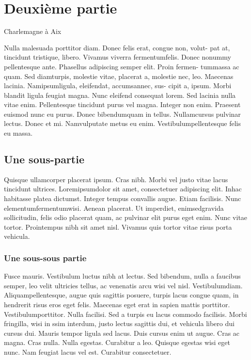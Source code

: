 \documentclass[12pt,twoside]{book}
\begin{document}
\section{Deuxième partie}

Charlemagne à Aix


Nulla malesuada porttitor diam. Donec felis erat, congue non, volut-
pat at, tincidunt tristique, libero. Vivamus viverra fermentumfelis. Donec
nonummy pellentesque ante. Phasellus adipiscing semper elit. Proin fermen-
tummassa ac quam. Sed diamturpis, molestie vitae, placerat a, molestie
nec, leo. Maecenas lacinia. Namipsumligula, eleifendat, accumsannec, sus-
cipit a, ipsum. Morbi blandit ligula feugiat magna. Nunc eleifend consequat
lorem. Sed lacinia nulla vitae enim. Pellentesque tincidunt purus vel magna.
Integer non enim. Praesent euismod nunc eu purus. Donec bibendumquam
in tellus. Nullamcursus pulvinar lectus. Donec et mi. Namvulputate metus
eu enim. Vestibulumpellentesque felis eu massa.

\subsection{Une sous-partie}
Quisque ullamcorper placerat ipsum. Cras nibh. Morbi vel justo vitae
lacus tincidunt ultrices. Loremipsumdolor sit amet, consectetuer adipiscing
elit. Inhac habitasse platea dictumst. Integer tempus convallis augue. Etiam
facilisis. Nunc elementumfermentumwisi. Aenean placerat. Ut imperdiet,
enimsedgravida sollicitudin, felis odio placerat quam, ac pulvinar elit purus
eget enim. Nunc vitae tortor. Prointempus nibh sit amet nisl. Vivamus quis
tortor vitae risus porta vehicula.

\subsubsection{Une sous-sous partie}
Fusce mauris. Vestibulum luctus nibh at lectus. Sed bibendum, nulla
a faucibus semper, leo velit ultricies tellus, ac venenatis arcu wisi vel nisl.
Vestibulumdiam. Aliquampellentesque, augue quis sagittis posuere, turpis
lacus congue quam, in hendrerit risus eros eget felis. Maecenas eget erat in
sapien mattis porttitor. Vestibulumporttitor. Nulla facilisi. Sed a turpis eu
lacus commodo facilisis. Morbi fringilla, wisi in ssim interdum, justo
lectus sagittis dui, et vehicula libero dui cursus dui. Mauris tempor ligula
sed lacus. Duis cursus enim ut augue. Cras ac magna. Cras nulla. Nulla
egestas. Curabitur a leo. Quisque egestas wisi eget nunc. Nam feugiat lacus
vel est. Curabitur consectetuer.
\end{document}
